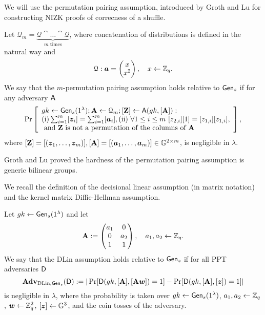 We will use the permutation pairing assumption, introduced by Groth and Lu for constructing NIZK proofs of correcness of a shuffle.
\begin{definition}\label{def:ppa}
Let $\mathcal{Q}_{m}=\underbrace{\mathcal{Q}\cat\ldots\cat\mathcal{Q}}_{m\text{ times}}$, where concatenation of  distributions is defined in the natural way and 
$$\mathcal{Q}: {\boldsymbol{a}}=\left(\begin{matrix}x\\x^2\end{matrix}\right),\quad x\gets\mathbb{Z}_q.$$
We say that the $m$-permutation pairing assumption holds relative to $\mathsf{Gen}_s$ if for any adversary $\mathsf{A}$
$$
\Pr\left[
\begin{array}{l}
gk\gets\mathsf{Gen}_s(1^\lambda);\mathbf{{A}}\gets\mathcal{Q}_{m};[\mathbf{{Z}}]\gets\mathsf{A}(gk,[\mathbf{{A}}]):\\
\mathrm{(i)} \sum_{i=1}^{m}[{\boldsymbol{z}}_i]=\sum_{i=1}^{m}[{\boldsymbol{a}}_i], \mathrm{(ii)}\ \forall 1\leq i\leq m\ [z_{2,i}][1]=[z_{1,i}][z_{1,i}],\\
\text{ and }\mathbf{{Z}}\text{ is not a permutation of the columns of }\mathbf{{A}}
\end{array}
\right],
$$
where $[\mathbf{{Z}}]=[({\boldsymbol{z}}_1,\ldots,{\boldsymbol{z}}_m)], [\mathbf{{A}}]=[({\boldsymbol{a}}_1,\ldots,{\boldsymbol{a}}_m)]\in\mathbb{G}^{2\times m}$,
is negligible in $\lambda$.
\end{definition}
Groth and Lu proved the hardness of the permutation pairing assumption is generic bilinear groups. 

We recall the definition of the decisional linear assumption (in matrix notation) and the kernel matrix Diffie-Hellman assumption.

\begin{definition}\label{def:dlin}
 Let  ${gk} 
\gets \mathsf{Gen}_s(1^\lambda)$ and let
$$
\mathbf{{A}} :=
\begin{pmatrix} 
a_1 & 0     \\
0     & a_2 \\
1     &  1
\end{pmatrix},
\quad
a_1,a_2\gets\mathbb{Z}_q.
$$
We say that the DLin assumption holds relative to $\mathsf{Gen}_s$ if for all PPT adversaries $\mathsf{D}$
$$
\mathbf{Adv}_{\mathrm{DLin},\mathsf{Gen}_s}(\mathsf{D}) := |
	\Pr[
		\mathsf{D}(
			gk,
			[\mathbf{{A}}],
			[\mathbf{{A}}{\boldsymbol{w}}])=1]
	-\Pr[
		\mathsf{D}(
		gk,
		[\mathbf{{A}}],
		[{\boldsymbol{z}}])=1]|
$$
is negligible in $\lambda$, where the probability is taken over $gk\gets\mathsf{Gen}_s(1^\lambda)$, $a_1,a_2\gets\mathbb{Z}_q$, ${\boldsymbol{w}}\gets\mathbb{Z}_q^2$, $[{\boldsymbol{z}}]\gets\mathbb{G}^3$, and the coin tosses of the adversary. 
\end{definition}

